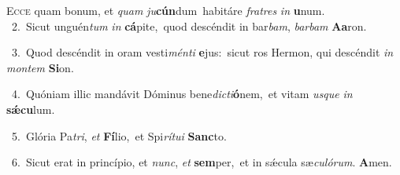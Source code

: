 \lettrine{\initial\textcolor{\initialcolor}{E}}{cce} quam bonum, et \textit{quam} \textit{ju}\-\textbf{cún}dum~\star habitáre \textit{fra}\-\textit{tres} \textit{in} \textbf{u}\-num.\\
{\numbfont\textcolor{\numbcolor}{~2.}}~Sicut unguén\textit{tum} \textit{in} \textbf{cá}\-pite,~\star quod descéndit in bar\-\textit{bam}\-, \textit{bar}\-\textit{bam} \textbf{A}\-\textbf{a}ron.\par
{\numbfont\textcolor{\numbcolor}{~3.}}~Quod descéndit in oram vesti\-\textit{mén}\-\textit{ti} \textbf{e}\-jus:~\star sicut ros Hermon, qui descéndit \textit{in} \textit{mon}\-\textit{tem} \textbf{Si}\-on.\par
{\numbfont\textcolor{\numbcolor}{~4.}}~Quóniam illic mandávit Dóminus bene\-\textit{dic}\-\textit{ti}\textbf{ó}nem,~\star et vitam \textit{us}\-\textit{que} \textit{in} \textbf{sǽ}\-\textbf{cu}lum.\par
{\numbfont\textcolor{\numbcolor}{~5.}}~Glória Pa\-\textit{tri}\-, \textit{et} \textbf{Fí}\-lio,~\star et Spi\-\textit{rí}\-\textit{tu}\textit{i} \textbf{Sanc}\-to.\par
{\numbfont\textcolor{\numbcolor}{~6.}}~Sicut erat in princípio, et \textit{nunc}\-, \textit{et} \textbf{sem}\-per,~\star et in sǽcula sæ\-\textit{cu}\-\textit{ló}\textit{rum}. \textbf{A}\-men.\par

